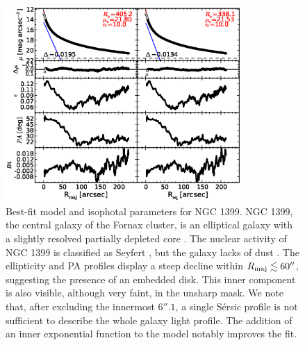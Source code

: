 \documentclass[preprint2]{emulateapj}
\newcommand{\fitfigurewidth}{0.8\textwidth}
\begin{document}
  \begin{figure}[h]
  \begin{center}
  \includegraphics[width=\fitfigurewidth]{images/n1399_1Dfit.eps}
  \caption{Best-fit model and isophotal parameters for NGC 1399.
  NGC 1399, the central galaxy of the Fornax cluster, is an elliptical galaxy with a slightly resolved partially depleted core \citep{rusli2013,dullograham2014cores}. 
  The nuclear activity of NGC 1399 is classified as Seyfert \citep{veroncettyveron2006},
  but the galaxy lacks of dust \citep{tran2001}.
  The ellipticity and PA profiles display a steep decline within $R_{\rm maj} \lesssim 60''$,
  suggesting the presence of an embedded disk.
  This inner component is also visible, although very faint, in the unsharp mask.
  We note that, after excluding the innermost $6''.1$,
  a single S\'ersic profile is not sufficient to describe the whole galaxy light profile.
  The addition of an inner exponential function to the model notably improves the fit.
  }
  \end{center}
  \end{figure}
\end{document}
